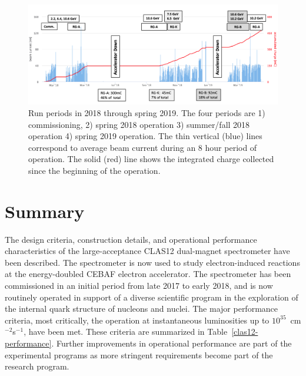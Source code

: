 \documentclass[final,3p,twocolumn]{elsarticle}
\begin{document}
\begin{figure}[htbp!]
\centerline{\includegraphics[width=1.9\columnwidth]{charges-bw.png}}
\caption{Run periods in 2018 through spring 2019. The four periods are 1) commissioning, 2) spring 2018 operation
3) summer/fall 2018 operation 4) spring 2019 operation. The thin vertical (blue) lines correspond to average beam
current during an 8 hour period of operation. The solid (red) line shows the integrated charge collected since the
beginning of the operation.}
\label{charges}
\end{figure}

\section{Summary} 

The design criteria, construction details, and operational performance characteristics of the large-acceptance
CLAS12 dual-magnet spectrometer have been described. The spectrometer is now used to study electron-induced
reactions at the energy-doubled CEBAF electron accelerator. The spectrometer has been commissioned in an initial
period from late 2017 to early 2018, and is now routinely operated in support of a diverse scientific program in the
exploration of the internal quark structure of nucleons and nuclei. The major performance criteria, most critically,
the operation at  instantaneous luminosities up to $10^{35}$~cm$^{-2}$s$^{-1}$, have been met. These criteria are
summarized in Table~\ref{clas12-performance}. Further improvements in operational performance are part of the
experimental programs as more stringent requirements become part of the research program.  
\end{document}
